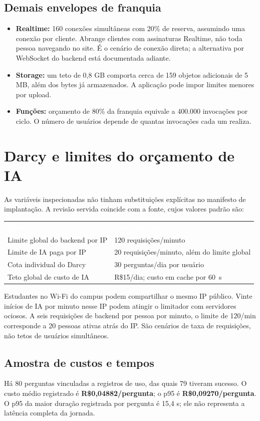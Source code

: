\documentclass[10pt,a4paper]{article}
\newcommand{\headcell}[1]{\textcolor{white}{\bfseries #1}}
\newcommand{\pagechapter}[1]{\clearpage\section{#1}}
\begin{document}
\subsection{Demais envelopes de franquia}
\begin{itemize}
\item \textbf{Realtime:} 160 conexões simultâneas com 20\% de reserva, assumindo uma conexão por cliente. Abrange clientes com assinaturas Realtime, não toda pessoa navegando no site. É o cenário de conexão direta; a alternativa por WebSocket do backend está documentada adiante.
\item \textbf{Storage:} um teto de 0,8 GB comporta cerca de 159 objetos adicionais de 5 MB, além dos bytes já armazenados. A aplicação pode impor limites menores por upload.
\item \textbf{Funções:} orçamento de 80\% da franquia equivale a 400.000 invocações por ciclo. O número de usuários depende de quantas invocações cada um realiza.
\end{itemize}

\pagechapter{Darcy e limites do orçamento de IA}
As variáveis inspecionadas não tinham substituições explícitas no manifesto de implantação. A revisão servida coincide com a fonte, cujos valores padrão são:
\begingroup\small\renewcommand{\arraystretch}{1.25}
\par\noindent\begin{tabularx}{\linewidth}{@{}Y L{64mm}@{}}
\headcell{Proteção}&\headcell{Valor padrão}\\
Limite global do backend por IP&120 requisições/minuto\\
Limite de IA paga por IP&20 requisições/minuto, além do limite global\\
Cota individual do Darcy&30 perguntas/dia por usuário\\
Teto global de custo de IA&R\$15/dia; custo em cache por 60~s\\
\end{tabularx}\endgroup

Estudantes no Wi-Fi do campus podem compartilhar o mesmo IP público. Vinte inícios de IA por minuto nesse IP podem atingir o limitador com servidores ociosos. A seis requisições de backend por pessoa por minuto, o limite de 120/min corresponde a 20 pessoas ativas atrás do IP. São cenários de taxa de requisições, não tetos de usuários simultâneos.

\subsection{Amostra de custos e tempos}
Há 80 perguntas vinculadas a registros de uso, das quais 79 tiveram sucesso. O custo médio registrado é \textbf{R\$0,04882/pergunta}; o p95 é \textbf{R\$0,09270/pergunta}. O p95 da maior duração registrada por pergunta é 15,4 s; ele não representa a latência completa da jornada.
\end{document}

